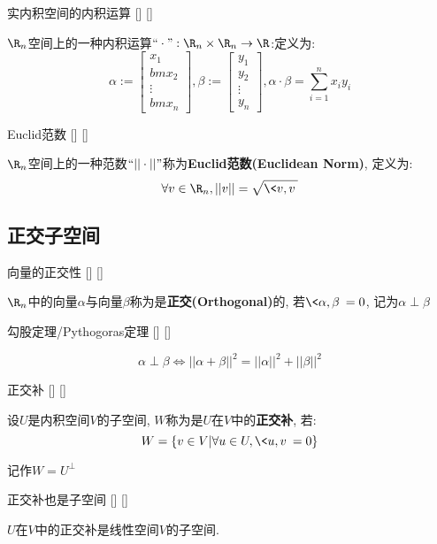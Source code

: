 \documentclass[UTF8]{ctexart}
\begin{document}
		\begin{dfn}
			[]
			{实内积空间的内积运算}
			[]
			[]

			$\R_n$空间上的一种内积运算$``\cdot":\R_n\times\R_n\to\R$:定义为: 
			\[\alpha:=\begin{bmatrix}x_1\\bm{x}_2\\\vdots\\bm{x}_n\end{bmatrix}, \beta:=\begin{bmatrix}y_1\\y_2\\\vdots\\y_n\end{bmatrix},\alpha\cdot\beta=\sum_{i=1}^{n}x_iy_i\]
		\end{dfn}
		
		\begin{dfn}
			[]
			{Euclid范数}
			[]
			[]

			$\R_n$空间上的一种范数$``||\cdot||"$称为\textbf{Euclid范数(Euclidean Norm)}, 定义为: 
			\[\forall v\in\R_n, ||v||=\sqrt{\<v,v\>}\]
		\end{dfn}
	
	\subsection{正交子空间}
		
		\begin{dfn}
			[]
			{向量的正交性}
			[]
			[]

			$\R_n$中的向量$\alpha$与向量$\beta$称为是\textbf{正交(Orthogonal)}的, 若$\<\alpha,\beta\>=0$, 记为$\alpha\perp\beta$
		\end{dfn}
		
		\begin{thm}
			[]
			{勾股定理/Pythogoras定理}
			[]
			[]

			\[\alpha\perp\beta\Longleftrightarrow||\alpha+\beta||^2=||\alpha||^2+||\beta||^2\]
		\end{thm}
		
		\begin{dfn}
			[]
			{正交补}
			[]
			[]

			设$U$是内积空间$V$的子空间, $W$称为是$U$在$V$中的\textbf{正交补}, 若: 
			\[W=\{v\in V|\forall u\in U, \<u,v\>=0\}\]

			记作$W=U^{\perp}$
		\end{dfn}

		\begin{ppt}
			[]
			{正交补也是子空间}
			[]
			[]

			$U$在$V$中的正交补是线性空间$V$的子空间. 
		\end{ppt}
		
\end{document}
